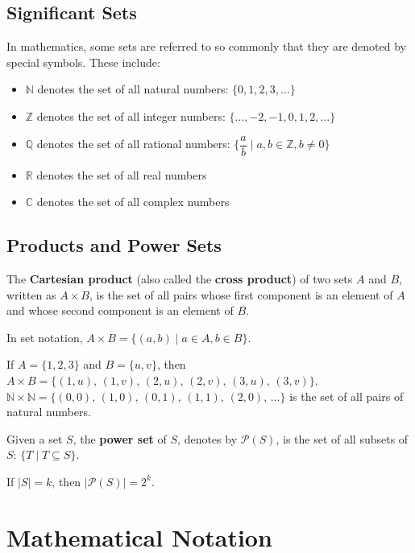 \documentclass[12pt,a4paper]{article}
\begin{document}
\subsection*{Significant Sets}
In mathematics, some sets are referred to so commonly that they are denoted by special symbols. These include:
\begin{itemize}
	\item $\mathbb{N}$ denotes the set of all natural numbers: $\{0, 1, 2, 3, \dots\}$
	\item $\mathbb{Z}$ denotes the set of all integer numbers: $\{\dots, -2, -1, 0, 1, 2, \dots\}$
	\item $\mathbb{Q}$ denotes the set of all rational numbers: $\{\dfrac{a}{b}\mid a, b \in \mathbb{Z}, b \neq 0\}$
	\item $\mathbb{R}$ denotes the set of all real numbers
	\item $\mathbb{C}$ denotes the set of all complex numbers
\end{itemize}

\subsection*{Products and Power Sets}
The \textbf{Cartesian product} (also called the \textbf{cross product}) of two sets $A$ and $B$, written as $A\times B$, is the set of all pairs whose first component is an element of $A$ and whose second component is an element of $B$.

\bigbreak

In set notation, $A\times B=\{(a, b)\mid a\in A, b\in B\}$.

\bigbreak

If $A=\{1, 2, 3\}$ and $B=\{u, v\}$, then $A\times B=\{(1, u),\, (1, v),\, (2, u),\, (2, v),\, (3, u),\, (3, v)\}$. \\
$\mathbb{N}\times \mathbb{N}=\{(0, 0),\, (1, 0),\, (0, 1),\, (1, 1),\, (2, 0),\, \dots\}$ is the set of all pairs of natural numbers.

\bigbreak

Given a set $S$, the \textbf{power set} of $S$, denotes by $\mathcal{P}(S)$, is the set of all subsets of $S$: $\{T\mid T\subseteq S\}$.

\bigbreak

If $\lvert S \rvert = k$, then $\lvert \mathcal{P}(S)\rvert=2^k$.

\section*{Mathematical Notation}
\end{document}
